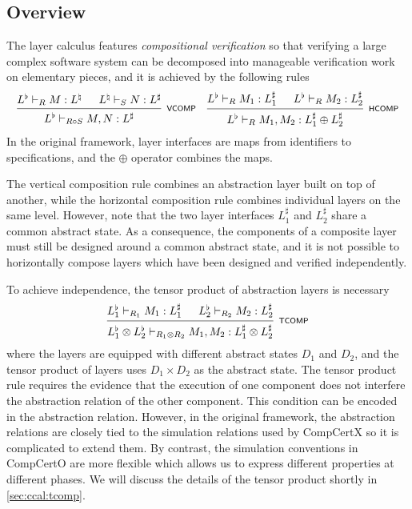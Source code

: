 \documentclass[acmsmall,review,anonymous]{acmart}\settopmatter{printfolios=true,printccs=false,printacmref=false}
\begin{document}


\subsection{Overview} %


The layer calculus features \emph{compositional verification}
so that verifying a large complex software system
can be decomposed into
manageable verification work
on elementary pieces,
and it is achieved by the following rules
\[
  \begin{prooftree}
    \hypo{L^\flat \vdash_R M : L^\natural}
    \hypo{L^\natural \vdash_S N : L^\sharp}
    \infer2[\scriptsize\kw{VCOMP}]{L^\flat \vdash_{R \circ S} M, N : L^\sharp}
  \end{prooftree}
  \quad
  \begin{prooftree}
    \hypo{L^\flat \vdash_R M_1 : L_1^\sharp}
    \hypo{L^\flat \vdash_R M_2 : L_2^\sharp}
    \infer2[\scriptsize\kw{HCOMP}]{L^\flat \vdash_R M_1, M_2 :
      L_1^\sharp \oplus L_2^\sharp}
  \end{prooftree}
\]
In the original framework,
layer interfaces are maps from identifiers to
specifications,
and the $\oplus$ operator combines the maps.

The vertical composition rule
combines an abstraction layer built on top of another,
while the horizontal composition rule combines
individual layers on the same level.
However, note that the two layer interfaces
$L_1^\sharp$ and $L_2^\sharp$
share a common abstract state.
As a consequence, 
the components of a composite layer
must still be designed around a common abstract state,
and it is not possible to horizontally compose layers
which have been designed and verified independently.

To achieve independence,
the tensor product of abstraction layers
is necessary
\[
  \begin{prooftree}
    \hypo{L^\flat_1 \vdash_{R_1} M_1 : L^\sharp_1}
    \hypo{L^\flat_2 \vdash_{R_2} M_2 : L^\sharp_2}
    \infer2[\scriptsize\kw{TCOMP}]
    {L^\flat_1 \otimes L^\flat_2 \vdash_{R_1 \otimes R_2}
      M_1, M_2 : L^\sharp_1 \otimes L^\sharp_2}
  \end{prooftree}
\]
where the layers are equipped with
different abstract states $D_1$ and $D_2$,
and the tensor product of layers uses
$D_1 \times D_2$ as the abstract state.
The tensor product rule
requires the evidence that
the execution of one component
does not interfere the abstraction relation
of the other component.
This condition can be encoded
in the abstraction relation.
However,
in the original framework,
the abstraction relations
are closely tied to
the simulation relations used by CompCertX
so it is complicated to extend them.
By contrast,
the simulation conventions in CompCertO
are more flexible
which allows us to express
different properties at different phases.
We will discuss the details of the tensor product
shortly in \ref{sec:ccal:tcomp}.
\end{document}
